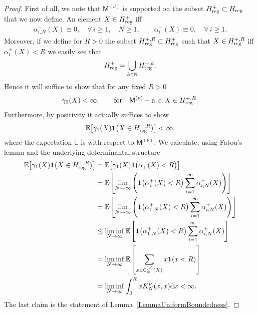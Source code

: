 \begin{proof}First of all, we note that $\mathsf{M}^{(\nu)}$ is supported on the subset $H^{+}_{{\rm reg}}\subset H_{{\rm reg}}$ that we now define. An element $X \in H^+_{{\rm reg}}$ iff
\begin{gather*}
\alpha_{i,N}^-(X)\equiv 0, \quad \forall\, i\ge 1, \quad N\ge 1, \qquad \alpha_i^-(X) \equiv 0, \quad \forall\, i \ge 1.
\end{gather*}
Moreover, if we define for $R>0$ the subset $H^{+,R}_{{\rm reg}}\subset H^{+}_{{\rm reg}}$ such that $X \in H^{+,R}_{{\rm reg}}$ iff $\alpha_1^+(X)<R$ we easily see that
\begin{gather*}
H^{+}_{{\rm reg}}=\bigcup_{k \in \mathbb{N}} H^{+,k}_{{\rm reg}}.
\end{gather*}
Hence it will suffice to show that for any fixed $R>0$
\begin{gather*}
\gamma_1(X)<\infty, \qquad \text{for} \quad \mathsf{M}^{(\nu)}-\operatorname{a.e.} X \in H^{+,R}_{{\rm reg}}.
\end{gather*}
Furthermore, by positivity it actually suffices to show
\begin{gather*}
\mathbb{E}\big[\gamma_1(X) \textbf{1}\big(X \in H_{{\rm reg}}^{+,R}\big)\big]<\infty,
\end{gather*}
where the expectation $\mathbb{E}$ is with respect to $\mathsf{M}^{(\nu)}$. We calculate, using Fatou's lemma and the underlying determinantal structure
\begin{align*}
\mathbb{E}\big[\gamma_1(X) \textbf{1}\big(X \in H_{{\rm reg}}^{+,R}\big)\big]&=\mathbb{E}\big[\gamma_1(X) \textbf{1}\big(\alpha_1^+(X)<R\big)\big]\\
&=\mathbb{E}\left[\lim_{N\to \infty} \left(\textbf{1}\big(\alpha_1^+(X)<R\big)\sum_{i=1}^{\infty}\alpha_{i,N}^+(X)\right)\right]\\
&=\mathbb{E}\left[\lim_{N\to \infty} \left(\textbf{1}\big(\alpha_{1,N}^+(X)<R\big)\sum_{i=1}^{\infty}\alpha_{i,N}^+(X)\right)\right]\\
&\le\liminf_{N \to \infty}\mathbb{E}\left[\textbf{1}\big(\alpha_{1,N}^+(X)<R\big)\sum_{i=1}^{\infty}\alpha_{i,N}^+(X)\right]\\
&=\liminf_{N \to \infty}\mathbb{E}\left[\sum_{x \in \mathsf{C}_N^{(\nu)}(X)}x\textbf{1} (x<R )\right]\\
&=\liminf_{N \to \infty}\int_{0}^{R}x K_N^{\nu}(x,x){\rm d}x<\infty.
\end{align*}
The last claim is the statement of Lemma~\ref{LemmaUniformBoundedness}.
\end{proof}

